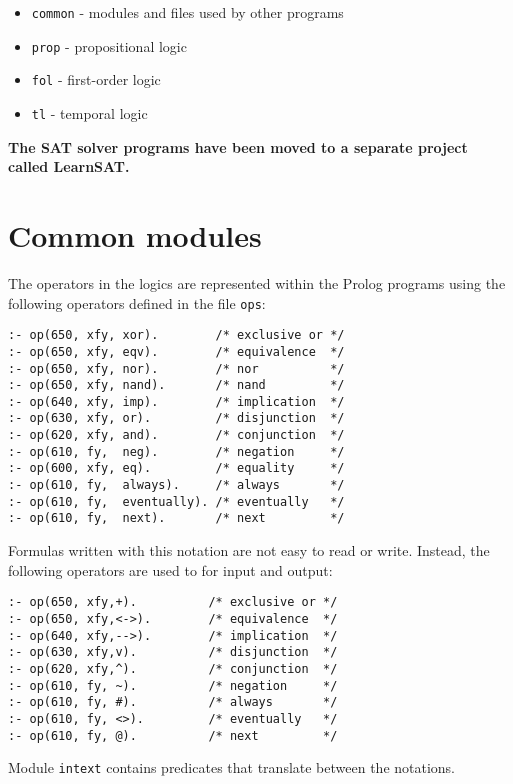 \documentclass[11pt]{article}
\newcommand*{\p}[1]{\textup{\texttt{#1}}}
\begin{document}
\begin{itemize}
\item \p{common} - modules and files used by other programs
\item \p{prop}   - propositional logic
\item \p{fol}    - first-order logic
\item \p{tl}     - temporal logic
\end{itemize}

\textbf{The SAT solver programs have been moved to a separate project called LearnSAT.}

\section{Common modules}\label{s.common}

The operators in the logics are represented within the Prolog programs
using the following operators defined in the file \p{ops}:

\begin{verbatim}
:- op(650, xfy, xor).        /* exclusive or */
:- op(650, xfy, eqv).        /* equivalence  */
:- op(650, xfy, nor).        /* nor          */
:- op(650, xfy, nand).       /* nand         */
:- op(640, xfy, imp).        /* implication  */
:- op(630, xfy, or).         /* disjunction  */
:- op(620, xfy, and).        /* conjunction  */
:- op(610, fy,  neg).        /* negation     */
:- op(600, xfy, eq).         /* equality     */
:- op(610, fy,  always).     /* always       */
:- op(610, fy,  eventually). /* eventually   */
:- op(610, fy,  next).       /* next         */
\end{verbatim}

Formulas written with this notation are not easy to read or write.
Instead, the following operators are used to for input and output:

\begin{verbatim}
:- op(650, xfy,+).          /* exclusive or */
:- op(650, xfy,<->).        /* equivalence  */
:- op(640, xfy,-->).        /* implication  */
:- op(630, xfy,v).          /* disjunction  */
:- op(620, xfy,^).          /* conjunction  */
:- op(610, fy, ~).          /* negation     */
:- op(610, fy, #).          /* always       */
:- op(610, fy, <>).         /* eventually   */
:- op(610, fy, @).          /* next         */
\end{verbatim}

Module \p{intext} contains predicates that translate between the
notations.
\end{document}
